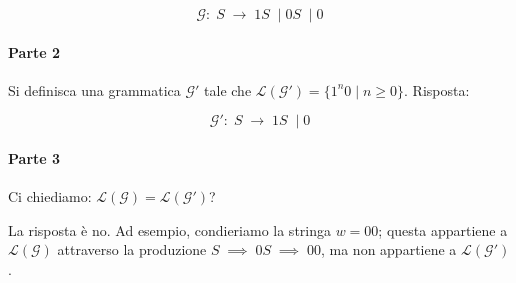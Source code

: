\documentclass[class=book, crop=false, oneside, 12pt]{standalone}
\begin{document}
\begin{equation*}
  \mathcal{G}:\; S \; \to\; 1S\; \mid 0S\; \mid 0
\end{equation*}

\paragraph{Parte 2}
Si definisca una grammatica \(\mathcal{G'}\) tale che \(\mathcal{L(G')} = \{ 1^n0 \mid n \geq 0 \}\). Risposta:

\begin{equation*}
  \mathcal{G'}:\; S\; \to\; 1S\; \mid 0
\end{equation*}

\paragraph{Parte 3}
Ci chiediamo: \(\mathcal{L(G)} = \mathcal{L(G')}\)?

La risposta è no. Ad esempio, condieriamo la stringa \(w = 00\); questa appartiene a \(\mathcal{L(G)}\) attraverso la produzione \(S\; \implies\; 0S\; \implies\; 00 \), ma non appartiene a \(\mathcal{L(G')}\).
\end{document}
